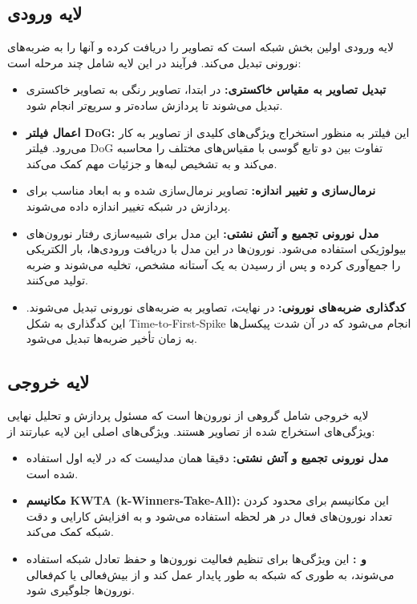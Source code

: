     \subsection*{لایه ورودی}
        لایه ورودی اولین بخش شبکه است که تصاویر را دریافت کرده و آنها را به ضربه‌های نورونی تبدیل می‌کند. فرآیند در این لایه شامل چند مرحله است:
        \begin{itemize}
            \item \textbf{تبدیل تصاویر به مقیاس خاکستری:} در ابتدا، تصاویر رنگی به تصاویر خاکستری تبدیل می‌شوند تا پردازش ساده‌تر و سریع‌تر انجام شود.
            \item \textbf{اعمال فیلتر 
            DoG:} 
            این فیلتر به منظور استخراج ویژگی‌های کلیدی از تصاویر به کار می‌رود. فیلتر 
            DoG 
            تفاوت بین دو تابع گوسی با مقیاس‌های مختلف را محاسبه می‌کند و به تشخیص لبه‌ها و جزئیات مهم کمک می‌کند.
            \item \textbf{نرمال‌سازی و تغییر اندازه:} تصاویر نرمال‌سازی شده و به ابعاد مناسب برای پردازش در شبکه تغییر اندازه داده می‌شوند.
            \item \textbf{مدل نورونی تجمیع و آتش نشتی:}  این مدل برای شبیه‌سازی رفتار نورون‌های بیولوژیکی استفاده می‌شود. نورون‌ها در این مدل با دریافت ورودی‌ها، بار الکتریکی را جمع‌آوری کرده و پس از رسیدن به یک آستانه مشخص، تخلیه می‌شوند و ضربه تولید می‌کنند.
            \item \textbf{کدگذاری ضربه‌های نورونی:} در نهایت، تصاویر به ضربه‌های نورونی تبدیل می‌شوند. این کدگذاری به شکل Time-to-First-Spike 
            انجام می‌شود که در آن شدت پیکسل‌ها به زمان تأخیر ضربه‌ها تبدیل می‌شود.
        \end{itemize}
    \subsection*{لایه خروجی} 
        لایه خروجی شامل گروهی از نورون‌ها است که مسئول پردازش و تحلیل نهایی ویژگی‌های استخراج شده از تصاویر هستند. ویژگی‌های اصلی این لایه عبارتند از:
        \begin{itemize}
            \item \textbf{مدل نورونی تجمیع و آتش نشتی:} 
            دقیقا همان مدلیست که در لایه اول استفاده شده است.
            \item \textbf{مکانیسم 
            KWTA (k-Winners-Take-All):}
            این مکانیسم برای محدود کردن تعداد نورون‌های فعال در هر لحظه استفاده می‌شود و به افزایش کارایی و دقت شبکه کمک می‌کند.
            \item \textbf{ و  :}  این ویژگی‌ها برای تنظیم فعالیت نورون‌ها و حفظ تعادل شبکه استفاده می‌شوند، به طوری که شبکه به طور پایدار عمل کند و از بیش‌فعالی یا کم‌فعالی نورون‌ها جلوگیری شود.
        \end{itemize}

